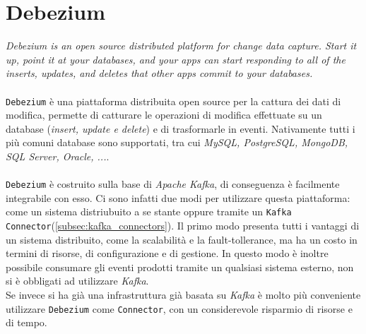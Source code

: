 \section{Debezium}
\label{sec:debezium_overview}
\textit{Debezium is an open source distributed platform for change data capture. Start it up, point it at your databases, and your apps can start responding to all of the inserts, updates, and deletes that other apps commit to your databases.}\cite*{debeziumwebsite}\\\\
\texttt{Debezium} è una piattaforma distribuita open source per la cattura dei dati di modifica, permette di catturare le operazioni di modifica effettuate su un database (\textit{insert, update e delete}) e di trasformarle in eventi.
Nativamente tutti i più comuni database sono supportati, tra cui \textit{MySQL, PostgreSQL, MongoDB, SQL Server, Oracle, ...}.\\\\
\texttt{Debezium} è costruito sulla base di \textit{Apache Kafka}, di conseguenza è facilmente integrabile con esso.
Ci sono infatti due modi per utilizzare questa piattaforma: come un sistema distriubuito a se stante oppure tramite un \texttt{Kafka Connector}(\ref{subsec:kafka_connectors}).
Il primo modo presenta tutti i vantaggi di un sistema distribuito, come la scalabilità e la fault-tollerance, ma ha un costo in termini di risorse, di configurazione e di gestione.
In questo modo è inoltre possibile consumare gli eventi prodotti tramite un qualsiasi sistema esterno, non si è obbligati ad utilizzare \textit{Kafka}.\\
Se invece si ha già una infrastruttura già basata su \textit{Kafka} è molto più conveniente utilizzare \texttt{Debezium} come \texttt{Connector}, con un considerevole risparmio di risorse e di tempo.  

\newpage
